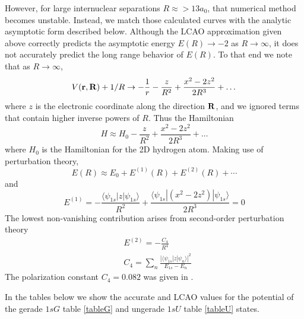 However, for large internuclear separations $ R \approx > 13 a_{0} $, that numerical method becomes unstable. Instead, we match those calculated curves with the analytic asymptotic form described
below.
Although the LCAO approximation given above correctly predicts the asymptotic energy
$ E(R) \rightarrow -2  $ as $ R \rightarrow \infty $, it does not accurately predict the long range behavior of $E(R).$ To that end we note that as $ R \rightarrow \infty $,
\begin{equation}
V({\bf r},{\bf R}) + 1/R \rightarrow -\frac{1}{r}-\frac{z}{R^2} + \frac{x^2-2 z^2}{2 R^3} + \dots
\end{equation}
where $z$ is the electronic coordinate along the direction ${\bf R}$, and we ignored terms that contain higher inverse powers of $R$. Thus the Hamiltonian
\begin{equation}
H \approx H_{0} -\frac{z}{R^2} + \frac{x^2-2 z^2}{2 R^3} + \dots
\end{equation}
where $H_{0}$ is the Hamiltonian for the 2D hydrogen atom. Making use of perturbation theory,
\begin{equation}
E(R) \approx E_{0} + E^{(1)}(R) + E^{(2)}(R) + \cdots
\end{equation}
and
\begin{equation}
E^{(1)} = - \frac{\langle \psi_{1s} |z| \psi_{1s} \rangle }{R^2}
+  \frac{\langle \psi_{1s} |(x^2-2 z^2)| \psi_{1s} \rangle }{2 R^3}  =0
\end{equation}
The lowest non-vanishing contribution arises from second-order perturbation theory
\begin{equation}
  \begin{split}
& E^{(2)} = -\frac{C_{4}}{R^4}  \nonumber \\
& C_{4} = \sum_{n} \frac{|\langle \psi_{1s} |z | \psi_{n} \rangle |^{2} }{E_{1s} - E_{n} }
  \end{split}
\end{equation}
The polarization constant $C_{4} =0.082 $ was given in \cite{YangXL}.

In the tables below we show the accurate and LCAO values for the potential of the gerade $ 1sG $ table \ref{tableG} and ungerade $ 1sU $ table \ref{tableU} states.

